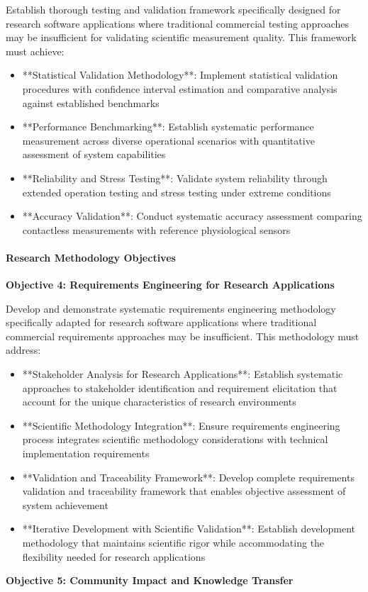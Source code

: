 \documentclass[11pt,a4paper]{article}
\begin{document}
Establish thorough testing and validation framework specifically designed for
research software applications where
traditional commercial testing approaches may be insufficient for validating
scientific measurement quality.  This
framework must achieve:

\begin{itemize}
\item **Statistical Validation Methodology**: Implement statistical validation procedures with confidence interval
  estimation and comparative analysis against established benchmarks
\item **Performance Benchmarking**: Establish systematic performance measurement across diverse operational scenarios with
  quantitative assessment of system capabilities
\item **Reliability and Stress Testing**: Validate system reliability through extended operation testing and stress testing
  under extreme conditions
\item **Accuracy Validation**: Conduct systematic accuracy assessment comparing contactless measurements with reference
  physiological sensors

\end{itemize}
\paragraph{Research Methodology Objectives}

\textbf{Objective 4: Requirements Engineering for Research Applications}

Develop and demonstrate systematic requirements engineering methodology specifically
adapted for research software
applications where traditional commercial requirements approaches may be insufficient.
This methodology must address:

\begin{itemize}
\item **Stakeholder Analysis for Research Applications**: Establish systematic approaches to stakeholder identification and
  requirement elicitation that account for the unique characteristics of research
  environments
\item **Scientific Methodology Integration**: Ensure requirements engineering process integrates scientific methodology
  considerations with technical implementation requirements
\item **Validation and Traceability Framework**: Develop complete requirements validation and traceability framework
  that enables objective assessment of system achievement
\item **Iterative Development with Scientific Validation**: Establish development methodology that maintains scientific
  rigor while accommodating the flexibility needed for research applications

\end{itemize}
\textbf{Objective 5: Community Impact and Knowledge Transfer}
\end{document}
